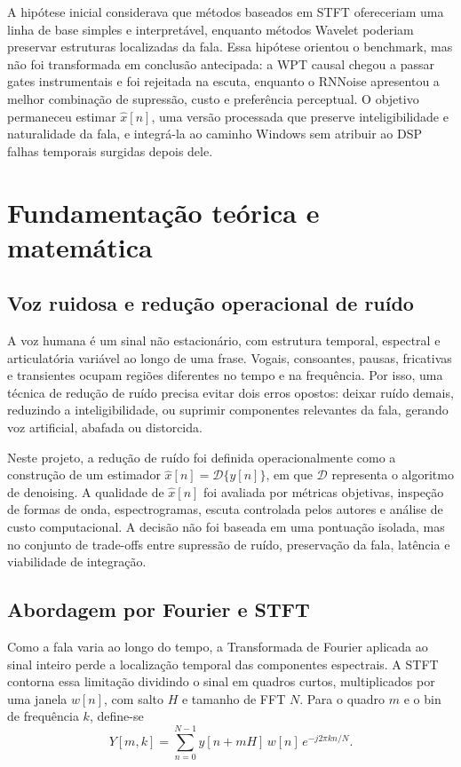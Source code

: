 A hipótese inicial considerava que métodos baseados em STFT ofereceriam uma linha de base simples e interpretável, enquanto métodos Wavelet poderiam preservar estruturas localizadas da fala. Essa hipótese orientou o benchmark, mas não foi transformada em conclusão antecipada: a WPT causal chegou a passar gates instrumentais e foi rejeitada na escuta, enquanto o RNNoise apresentou a melhor combinação de supressão, custo e preferência perceptual. O objetivo permaneceu estimar \(\hat{x}[n]\), uma versão processada que preserve inteligibilidade e naturalidade da fala, e integrá-la ao caminho Windows sem atribuir ao DSP falhas temporais surgidas depois dele.

\section{Fundamentação teórica e matemática}

\subsection{Voz ruidosa e redução operacional de ruído}

A voz humana é um sinal não estacionário, com estrutura temporal, espectral e articulatória variável ao longo de uma frase. Vogais, consoantes, pausas, fricativas e transientes ocupam regiões diferentes no tempo e na frequência. Por isso, uma técnica de redução de ruído precisa evitar dois erros opostos: deixar ruído demais, reduzindo a inteligibilidade, ou suprimir componentes relevantes da fala, gerando voz artificial, abafada ou distorcida.

Neste projeto, a redução de ruído foi definida operacionalmente como a construção de um estimador \(\hat{x}[n] = \mathcal{D}\{y[n]\}\), em que \(\mathcal{D}\) representa o algoritmo de denoising. A qualidade de \(\hat{x}[n]\) foi avaliada por métricas objetivas, inspeção de formas de onda, espectrogramas, escuta controlada pelos autores e análise de custo computacional. A decisão não foi baseada em uma pontuação isolada, mas no conjunto de trade-offs entre supressão de ruído, preservação da fala, latência e viabilidade de integração.

\subsection{Abordagem por Fourier e STFT}

Como a fala varia ao longo do tempo, a Transformada de Fourier aplicada ao sinal inteiro perde a localização temporal das componentes espectrais. A STFT contorna essa limitação dividindo o sinal em quadros curtos, multiplicados por uma janela \(w[n]\), com salto \(H\) e tamanho de FFT \(N\). Para o quadro \(m\) e o bin de frequência \(k\), define-se
\begin{equation}
    Y[m,k] = \sum_{n=0}^{N-1} y[n+mH]\,w[n]\,e^{-j2\pi kn/N}.
    \label{eq:stft}
\end{equation}


